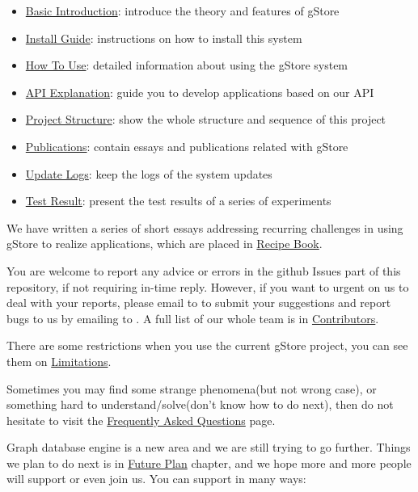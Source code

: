 \documentclass[titlepage, a4paper, 12pt]{article}
\begin{document}
\begin{itemize}
\item
  \hyperref[chapter02]{Basic Introduction}: introduce the theory and features of gStore
\item
  \hyperref[chapter03]{Install Guide}: instructions on how to install this system
\item
  \hyperref[chapter04]{How To Use}: detailed information about using the gStore system
\item
  \hyperref[chapter05]{API Explanation}: guide you to develop applications based on our API
\item
  \hyperref[chapter07]{Project Structure}: show the whole structure and sequence of this project
\item
  \hyperref[chapter08]{Publications}: contain essays and publications
  related with gStore
\item
  \hyperref[chapter09]{Update Logs}: keep the logs of the system updates
\item
  \hyperref[chapter14]{Test Result}: present the test results of a series of experiments
\end{itemize}


We have written a series of short essays addressing recurring challenges in using gStore to realize applications, which are placed in
\hyperref[chapter11]{Recipe Book}.

You are welcome to report any advice or errors in the github Issues part of this repository, if not requiring in-time reply. However, if you want to urgent on us to deal with your reports, please email to to submit your suggestions and report bugs to us by emailing to . A full list of our whole team is in \hyperref[chapter12]{Contributors}.

There are some restrictions when you use the current gStore project, you can see them on \hyperref[chapter09]{Limitations}.

Sometimes you may find some strange phenomena(but not wrong case), or something hard to understand/solve(don't know how to do next), then do not hesitate to visit the \hyperref[chapter10]{Frequently Asked Questions} page.

Graph database engine is a new area and we are still trying to go further. Things we plan to do next is in \hyperref[chapter15]{Future Plan} chapter, and we hope more and more people will support or even
join us. You can support in many ways:
\end{document}
